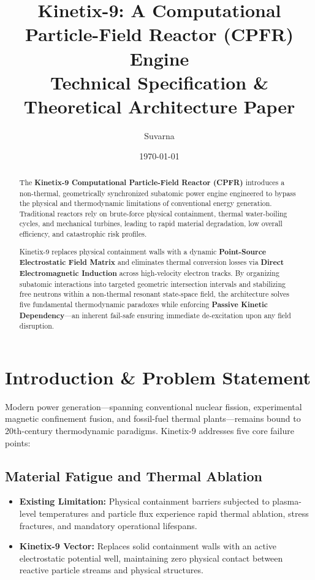 \documentclass[11pt,a4paper]{article}
\title{\textbf{Kinetix-9: A Computational Particle-Field Reactor (CPFR) Engine} \\ \large Technical Specification \& Theoretical Architecture Paper}
\author{Suvarna}
\date{\today}
\begin{document}
\maketitle

\begin{abstract}
The \textbf{Kinetix-9 Computational Particle-Field Reactor (CPFR)} introduces a non-thermal, geometrically synchronized subatomic power engine engineered to bypass the physical and thermodynamic limitations of conventional energy generation. Traditional reactors rely on brute-force physical containment, thermal water-boiling cycles, and mechanical turbines, leading to rapid material degradation, low overall efficiency, and catastrophic risk profiles. 

Kinetix-9 replaces physical containment walls with a dynamic \textbf{Point-Source Electrostatic Field Matrix} and eliminates thermal conversion losses via \textbf{Direct Electromagnetic Induction} across high-velocity electron tracks. By organizing subatomic interactions into targeted geometric intersection intervals and stabilizing free neutrons within a non-thermal resonant state-space field, the architecture solves five fundamental thermodynamic paradoxes while enforcing \textbf{Passive Kinetic Dependency}—an inherent fail-safe ensuring immediate de-excitation upon any field disruption.
\end{abstract}

\section{Introduction \& Problem Statement}
Modern power generation—spanning conventional nuclear fission, experimental magnetic confinement fusion, and fossil-fuel thermal plants—remains bound to 20th-century thermodynamic paradigms. Kinetix-9 addresses five core failure points:

\subsection{Material Fatigue and Thermal Ablation}
\begin{itemize}
    \item \textbf{Existing Limitation:} Physical containment barriers subjected to plasma-level temperatures and particle flux experience rapid thermal ablation, stress fractures, and mandatory operational lifespans.
    \item \textbf{Kinetix-9 Vector:} Replaces solid containment walls with an active electrostatic potential well, maintaining zero physical contact between reactive particle streams and physical structures.
\end{itemize}
\end{document}
